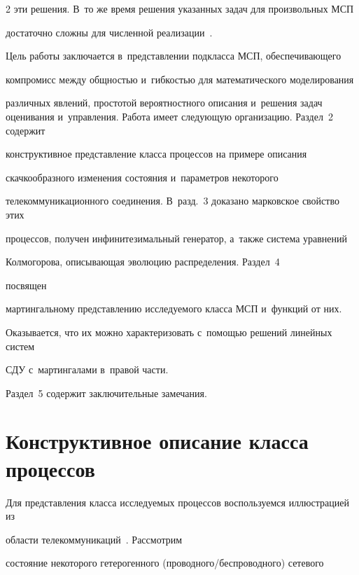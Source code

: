 \begin{multicols}{2}
эти решения. В~то же время решения указанных задач для произвольных МСП 


достаточно сложны для численной реализации~\cite{LSh_86, WD_79, CGT_02}.





Цель работы заключается в~представлении подкласса МСП, обеспечивающего 


компромисс между общностью и~гибкостью для математического моделирования 


различных явлений, простотой вероятностного описания и~решения задач оценивания и~управ\-ле\-ния. Работа имеет следующую организа\-цию. Раздел~2 содержит 


конструктивное представ\-ле\-ние класса процессов на примере описания 


скачкообразного изменения состояния и~па\-ра\-мет\-ров некоторого 


телекоммуникационного соединения. В~разд.~3 доказано марковское свойство этих %


процессов, получен инфинитезимальный генератор, а~также сис\-те\-ма уравнений 


Колмогорова, описывающая эволюцию распределения. Раздел~4 %


посвящен 


мартингальному представлению ис\-сле\-ду\-емо\-го класса МСП и~функций от них. 


Оказывается, что их можно характеризовать с~по\-мощью решений линейных сис\-тем 


СДУ с~мартингалами в~правой части. 


Раздел~5 содержит заключительные замечания.





\section{Конструктивное описание класса процессов}





Для представления класса исследуемых процессов воспользуемся иллюстрацией из 


области телекоммуникаций~\cite{B_14, B_16_1, B_16_2, G_23_1, B_21_1}. Рассмотрим 


состояние некоторого гетерогенного (про\-вод\-но\-го/бес\-про\-вод\-но\-го) сетевого 



\end{multicols}
